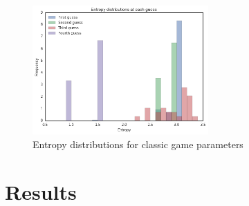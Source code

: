 \documentclass[11pt]{article}
\begin{document}
\begin{figure}[!htbp]
\centering
\includegraphics[width=0.6\textwidth]{img/entropy}
\caption{Entropy distributions for classic game parameters}
\label{fig:entropy}
\end{figure}

\newpage
\section{Results}

\newpage

\nocite{runarsson2010adapting}
\nocite{merelo2010finding}
\nocite{doerr2013playing}
\nocite{merelo2013improving}
\nocite{snydermastermind}
\nocite{knuth76}

 

\end{document}
